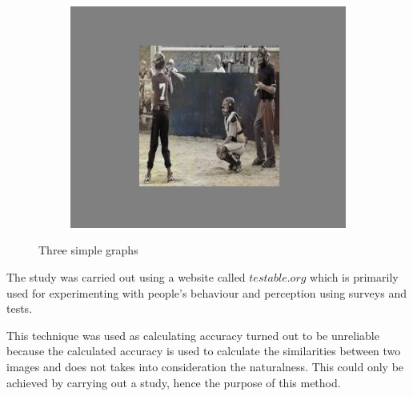 \begin{figure}[H]
\begin{subfigure}[b]{0.3\textwidth}
         \caption{}
         \label{fig:three sin x}
     \end{subfigure}
     \hfill
     \begin{subfigure}[b]{0.3\textwidth}
         \centering
         \includegraphics[width=\textwidth]{sections/figures/study_3.JPG}
         \caption{}
         \label{fig:five over x}
     \end{subfigure}
        \caption{Three simple graphs}
        \label{fig:three graphs}
\end{figure}



The study was carried out using a website called \(testable.org\) which is primarily used for experimenting with people's behaviour and perception using surveys and tests. 

This technique was used as calculating accuracy turned out to be unreliable because the calculated accuracy is used to calculate the similarities between two images and does not takes into consideration the naturalness. This could only be achieved by carrying out a study, hence the purpose of this method.












